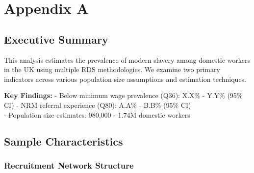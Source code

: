 \documentclass[
  12pt,
]{article}
\theoremstyle{plain}
\theoremstyle{definition}
\begin{document}
\newpage

\appendix

\section{Appendix A}\label{appendix-a}

\subsection{Executive Summary}\label{executive-summary}

This analysis estimates the prevalence of modern slavery among domestic
workers in the UK using multiple RDS methodologies. We examine two
primary indicators across various population size assumptions and
estimation techniques.

\textbf{Key Findings:} - Below minimum wage prevalence (Q36): X.X\% -
Y.Y\% (95\% CI) - NRM referral experience (Q80): A.A\% - B.B\% (95\%
CI)\\
- Population size estimates: 980,000 - 1.74M domestic workers

\subsection{Sample Characteristics}\label{sample-characteristics}

\subsubsection{Recruitment Network
Structure}\label{recruitment-network-structure}
\end{document}
